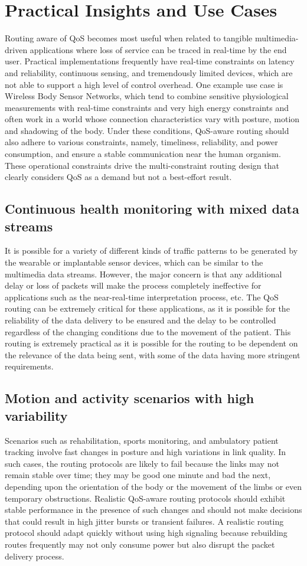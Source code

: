 \documentclass[12pt]{article}
\begin{document}
	\section{Practical Insights and Use Cases}
    Routing aware of QoS becomes most useful when related to tangible multimedia-driven applications where loss of service can be traced in real-time by the end user. Practical implementations frequently have real-time constraints on latency and reliability, continuous sensing, and tremendously limited devices, which are not able to support a high level of control overhead. One example use case is Wireless Body Sensor Networks, which tend to combine sensitive physiological measurements with real-time constraints and very high energy constraints and often work in a world whose connection characteristics vary with posture, motion and shadowing of the body. Under these conditions, QoS-aware routing should also adhere to various constraints, namely, timeliness, reliability, and power consumption, and ensure a stable communication near the human organism. These operational constraints drive the multi-constraint routing design that clearly considers QoS as a demand but not a best-effort result.




    \subsection{Continuous health monitoring with mixed data streams}
    It is possible \cite{zuhra2020miqos}for a variety of different kinds of traffic patterns to be generated by the wearable or implantable sensor devices, which can be similar to the multimedia data streams. However, the major concern is that any additional delay or loss of packets will make the process completely ineffective for applications such as the near-real-time interpretation process, etc. The QoS routing can be extremely critical for these applications, as it is possible for the reliability of the data delivery to be ensured and the delay to be controlled regardless of the changing conditions due to the movement of the patient. This routing is extremely practical as it is possible for the routing to be dependent on the relevance of the data being sent, with some of the data having more stringent requirements.
    \subsection{Motion and activity scenarios with high variability}
    Scenarios such as rehabilitation, sports monitoring, and ambulatory patient tracking involve fast changes in posture and high variations in link quality. In such cases, the routing protocols are likely to fail because the links may not remain stable over time; they may be good one minute and bad the next, depending upon the orientation of the body or the movement of the limbs or even temporary obstructions. Realistic QoS-aware routing protocols should exhibit stable performance in the presence of such changes and should not make decisions that could result in high jitter bursts or transient failures. A realistic routing protocol should adapt quickly without using high signaling because rebuilding routes frequently may not only consume power but also disrupt the packet delivery process.
\end{document}

